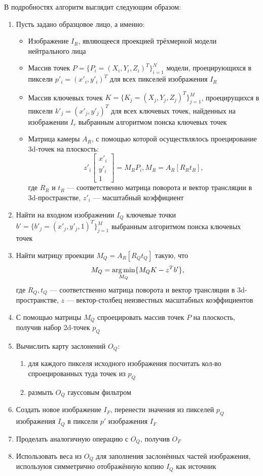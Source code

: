 В подробностях алгоритм выглядит следующим образом:
\begin{enumerate}
\item Пусть задано образцовое лицо, а именно:
\begin{itemize}
	\item Изображение $ I_R $, являющееся проекцией трёхмерной модели нейтрального лица
	\item Массив точек $ P = \{ P_i = (X_i, Y_i, Z_i)^T \}_{i=1}^N $ модели, проецирующихся в пиксели  $ p'_i = (x'_i, y'_i)^T  $ для всех пикселей изображения $ I_R $
	\item Массив ключевых точек $ K = \{ K_j = (X_j, Y_j, Z_j)^T \}_{j=1}^M $, проецирущихся в пиксели $ k'_j = (x'_j, y'_j)^T  $ для всех ключевых точек, найденных на изображении $ I_r $ выбранным алгоритмом поиска ключевых точек
	\item Матрица камеры $ A_R $, с помощью которой осуществлялось проецирование 3d-точек на плоскость:
	$$
	z'_i \begin{bmatrix} x'_i \\ y'_i \\ 1 \end{bmatrix}  = M_R P_i, M_R = A_R [R_R t_R],
	$$
где $ R_R $ и $ t_R $ --- соответственно матрица поворота и вектор трансляции в 3d-пространстве, $ z'_i $ --- масштабный коэффициент
\end{itemize} 
\item Найти на входном изображении $I_Q$ ключевые точки \\
$ b' = \{ b'_j = (x'_j, y'_j, 1)^T \}_{j=1}^M $ выбранным алгоритмом поиска ключевых точек
\item Найти матрицу проекции $ M_Q = A_R \left [ R_Q t_Q \right ] $ такую, что 
$$
M_Q = \operatorname*{arg\,min}_{M_Q} \lbrace M_Q K - z^T b' \rbrace,
$$
где $ R_Q, t_Q $ --- соответственно матрица поворота и вектор трансляции в 3d-пространстве, $ z $ --- вектор-столбец неизвестных масштабных коэффициентов
\item С помощью матрицы $ M_Q $ спроецировать массив точек $ P $ на плоскость, получив набор 2d-точек $ p_Q $
\item Вычислить карту заслонений $ O_Q $:
\begin{enumerate}
	\item для каждого пикселя исходного изображения посчитать кол-во спроецированных туда точек из $p_Q$
	\item размыть $ O_Q $ гауссовым фильтром
\end{enumerate}
\item Создать новое изображение $ I_F $, перенести значения из пикселей $ p_Q $ изображения $I_Q$ в пиксели $p'$ изображения $I_F$
\item Проделать аналогичную операцию с $O_Q$, получив $O_F$
\item Использовать веса из $O_Q$ для заполнения заслонённых частей изображения, используюя симметрично отображённую копию $I_Q$ как источник
\end{enumerate}

